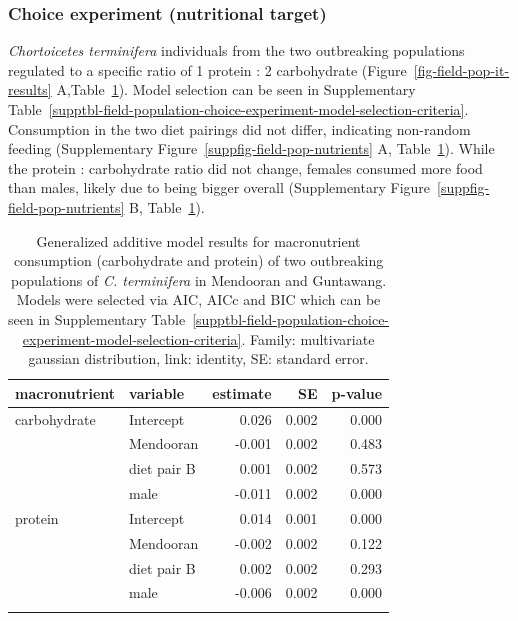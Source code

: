 \documentclass[
]{article}
\begin{document}
\subsubsection{Choice experiment (nutritional
target)}\label{choice-experiment-nutritional-target}

\emph{Chortoicetes terminifera} individuals from the two outbreaking
populations regulated to a specific ratio of 1 protein : 2 carbohydrate
(Figure~\ref{fig-field-pop-it-results}
A,Table~\ref{tbl-field-population-it-model}). Model selection can be
seen in
Supplementary Table~\ref{supptbl-field-population-choice-experiment-model-selection-criteria}.
Consumption in the two diet pairings did not differ, indicating
non-random feeding
(Supplementary Figure~\ref{suppfig-field-pop-nutrients} A,
Table~\ref{tbl-field-population-it-model}). While the protein :
carbohydrate ratio did not change, females consumed more food than
males, likely due to being bigger overall
(Supplementary Figure~\ref{suppfig-field-pop-nutrients} B,
Table~\ref{tbl-field-population-it-model}).

\begingroup
\fontsize{12.0pt}{14.4pt}\selectfont

\begin{longtable}{llrrr}

\toprule
macronutrient & variable & estimate & SE & p-value \\ 
\midrule\addlinespace[2.5pt]
carbohydrate & Intercept & 0.026 & 0.002 & 0.000 \\ 
 & Mendooran & -0.001 & 0.002 & 0.483 \\ 
 & diet pair B & 0.001 & 0.002 & 0.573 \\ 
 & male & -0.011 & 0.002 & 0.000 \\ 
protein & Intercept & 0.014 & 0.001 & 0.000 \\ 
 & Mendooran & -0.002 & 0.002 & 0.122 \\ 
 & diet pair B & 0.002 & 0.002 & 0.293 \\ 
 & male & -0.006 & 0.002 & 0.000 \\ 
\bottomrule

\caption{\label{tbl-field-population-it-model}Generalized additive model
results for macronutrient consumption (carbohydrate and protein) of two
outbreaking populations of \emph{C. terminifera} in Mendooran and
Guntawang. Models were selected via AIC, AICc and BIC which can be seen
in
Supplementary Table~\ref{supptbl-field-population-choice-experiment-model-selection-criteria}.
Family: multivariate gaussian distribution, link: identity, SE: standard
error.}

\tabularnewline

\end{longtable}
\end{document}
